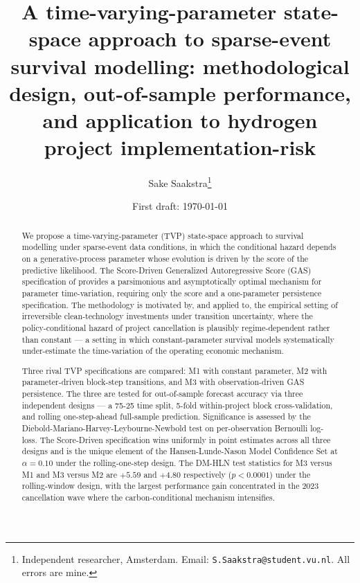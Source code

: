 \documentclass[12pt,a4paper]{article}
\title{A time-varying-parameter state-space approach to sparse-event survival modelling: methodological design, out-of-sample performance, and application to hydrogen project implementation-risk}
\author{Sake Saakstra\thanks{Independent researcher, Amsterdam. Email: \texttt{S.Saakstra@student.vu.nl}. All errors are mine.}}
\date{First draft: \today}
\theoremstyle{plain}
\theoremstyle{definition}
\begin{document}
\maketitle

\begin{abstract}
\noindent
We propose a time-varying-parameter (TVP) state-space approach to survival modelling under sparse-event data conditions, in which the conditional hazard depends on a generative-process parameter whose evolution is driven by the score of the predictive likelihood. The Score-Driven Generalized Autoregressive Score (GAS) specification of \cite{creal2013generalized} provides a parsimonious and asymptotically optimal mechanism for parameter time-variation, requiring only the score and a one-parameter persistence specification. The methodology is motivated by, and applied to, the empirical setting of irreversible clean-technology investments under transition uncertainty, where the policy-conditional hazard of project cancellation is plausibly regime-dependent rather than constant --- a setting in which constant-parameter survival models systematically under-estimate the time-variation of the operating economic mechanism.

Three rival TVP specifications are compared: M1 with constant parameter, M2 with parameter-driven block-step transitions, and M3 with observation-driven GAS persistence. The three are tested for out-of-sample forecast accuracy via three independent designs --- a 75-25 time split, 5-fold within-project block cross-validation, and rolling one-step-ahead full-sample prediction. Significance is assessed by the Diebold-Mariano-Harvey-Leybourne-Newbold test on per-observation Bernoulli log-loss. The Score-Driven specification wins uniformly in point estimates across all three designs and is the unique element of the Hansen-Lunde-Nason Model Confidence Set at $\alpha = 0.10$ under the rolling-one-step design. The DM-HLN test statistics for M3 versus M1 and M3 versus M2 are $+5.59$ and $+4.80$ respectively ($p < 0.0001$) under the rolling-window design, with the largest performance gain concentrated in the 2023 cancellation wave where the carbon-conditional mechanism intensifies.


\end{abstract}
\end{document}
